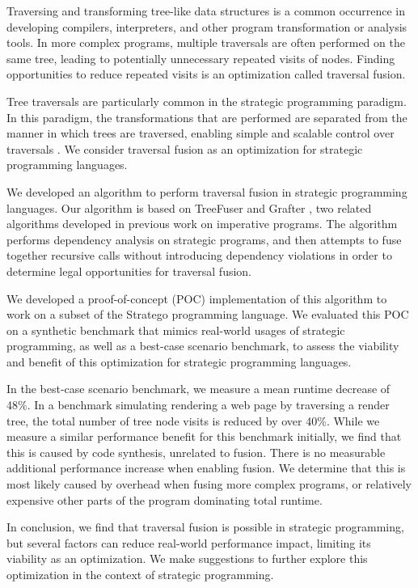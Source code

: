 
Traversing and transforming tree-like data structures is a common occurrence in developing compilers, interpreters, and other program transformation or analysis tools. In more complex programs, multiple traversals are often performed on the same tree, leading to potentially unnecessary repeated visits of nodes. Finding opportunities to reduce repeated visits is an optimization called traversal fusion.

Tree traversals are particularly common in the strategic programming paradigm. In this paradigm, the transformations that are performed are separated from the manner in which trees are traversed, enabling simple and scalable control over traversals \cite{LaemmelVV02}. We consider traversal fusion as an optimization for strategic programming languages.

We developed an algorithm to perform traversal fusion in strategic programming languages. Our algorithm is based on TreeFuser and Grafter \cite{SakkaS017, SakkaSN019}, two related algorithms developed in previous work on imperative programs. The algorithm performs dependency analysis on strategic programs, and then attempts to fuse together recursive calls without introducing dependency violations in order to determine legal opportunities for traversal fusion.

We developed a proof-of-concept (POC) implementation of this algorithm to work on a subset of the Stratego programming language. We evaluated this POC on a synthetic benchmark that mimics real-world usages of strategic programming, as well as a best-case scenario benchmark, to assess the viability and benefit of this optimization for strategic programming languages.

In the best-case scenario benchmark, we measure a mean runtime decrease of 48\%. In a benchmark simulating rendering a web page by traversing a render tree, the total number of tree node visits is reduced by over 40\%. While we measure a similar performance benefit for this benchmark initially, we find that this is caused by code synthesis, unrelated to fusion. There is no measurable additional performance increase when enabling fusion. We determine that this is most likely caused by overhead when fusing more complex programs, or relatively expensive other parts of the program dominating total runtime.

In conclusion, we find that traversal fusion is possible in strategic programming, but several factors can reduce real-world performance impact, limiting its viability as an optimization. We make suggestions to further explore this optimization in the context of strategic programming.
